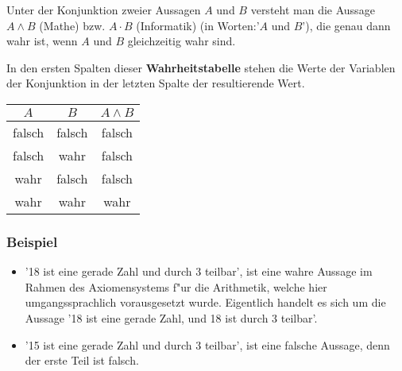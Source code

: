 \begin{definition}[Konjunktion]
Unter der Konjunktion zweier Aussagen $A$ und $B$ versteht man die Aussage $A \land B$ (Mathe) bzw. $A \cdot B$ (Informatik) (in Worten:'$A$ und $B$'), die genau dann wahr ist, wenn $A$ und $B$ gleichzeitig wahr sind.
\end{definition}
In den ersten Spalten dieser \textbf{Wahrheitstabelle} stehen die Werte der Variablen der Konjunktion in der letzten Spalte der resultierende Wert.
\begin{center}
\begin{tabular}{c|c||c}
 $A$& $B$  &  $A \land B$  \\ 
\hline
\cellcolor{ared} falsch & \cellcolor{ared} falsch & \cellcolor{ared} falsch   \\ 
\cellcolor{ared} falsch & \cellcolor{agreen} wahr & \cellcolor{ared} falsch  \\ 
\cellcolor{agreen} wahr & \cellcolor{ared} falsch & \cellcolor{ared} falsch   \\ 
\cellcolor{agreen} wahr & \cellcolor{agreen} wahr & \cellcolor{agreen} wahr  \\ 
\hline
\end{tabular}
\end{center}

\subsubsection*{Beispiel}
\begin{itemize}
	\item '18 ist eine gerade Zahl und durch 3 teilbar', ist eine wahre Aussage im Rahmen des Axiomensystems f"ur die Arithmetik, welche hier umgangssprachlich vorausgesetzt wurde. Eigentlich handelt es sich um die Aussage '18 ist eine gerade Zahl, und 18 ist durch 3 teilbar'.
	\item '15 ist eine gerade Zahl und durch 3 teilbar', ist eine falsche Aussage, denn der erste Teil ist falsch.
\end{itemize}


